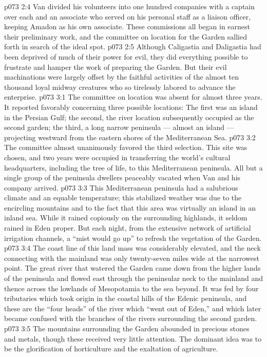 \vs p073 2:4 Van divided his volunteers into one hundred companies with a captain over each and an associate who served on his personal staff as a liaison officer, keeping Amadon as his own associate. These commissions all began in earnest their preliminary work, and the committee on location for the Garden sallied forth in search of the ideal spot.
\vs p073 2:5 \pc Although Caligastia and Daligastia had been deprived of much of their power for evil, they did everything possible to frustrate and hamper the work of preparing the Garden. But their evil machinations were largely offset by the faithful activities of the almost ten thousand loyal midway creatures who so tirelessly labored to advance the enterprise.
\vs p073 3:1 The committee on location was absent for almost three years. It reported favorably concerning three possible locations: The first was an island in the Persian Gulf; the second, the river location subsequently occupied as the second garden; the third, a long narrow peninsula --- almost an island --- projecting westward from the eastern shores of the Mediterranean Sea.
\vs p073 3:2 The committee almost unanimously favored the third selection. This site was chosen, and two years were occupied in transferring the world’s cultural headquarters, including the tree of life, to this Mediterranean peninsula. All but a single group of the peninsula dwellers peaceably vacated when Van and his company arrived.
\vs p073 3:3 \pc This Mediterranean peninsula had a salubrious climate and an equable temperature; this stabilized weather was due to the encircling mountains and to the fact that this area was virtually an island in an inland sea. While it rained copiously on the surrounding highlands, it seldom rained in Eden proper. But each night, from the extensive network of artificial irrigation channels, a “mist would go up” to refresh the vegetation of the Garden.
\vs p073 3:4 The coast line of this land mass was considerably elevated, and the neck connecting with the mainland was only twenty\hyp{}seven miles wide at the narrowest point. The great river that watered the Garden came down from the higher lands of the peninsula and flowed east through the peninsular neck to the mainland and thence across the lowlands of Mesopotamia to the sea beyond. It was fed by four tributaries which took origin in the coastal hills of the Edenic peninsula, and these are the “four heads” of the river which “went out of Eden,” and which later became confused with the branches of the rivers surrounding the second garden.
\vs p073 3:5 The mountains surrounding the Garden abounded in precious stones and metals, though these received very little attention. The dominant idea was to be the glorification of horticulture and the exaltation of agriculture.
